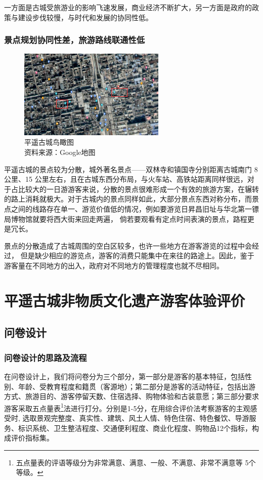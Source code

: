 \documentclass[UTF8]{ctexart}
\begin{document}
        一方面是古城受旅游业的影响飞速发展，商业经济不断扩大，另一方面是政府的政策与建设步伐较慢，与时代和发展的协同性低。
        \subsubsection{景点规划协同性差，旅游路线联通性低}
        \begin{figure}[H]
        \centering
        \includegraphics[width=7cm]{地图.png}
        \caption[plain]{平遥古城鸟瞰图\\资料来源：Google地图}
        \label{fig:my_label}
        \end{figure}
        平遥古城的景点较为分散，城外著名景点——双林寺和镇国寺分别距离古城南门 8 公里、15 公里左右，且在古城东西分布局，与火车站、高铁站距离同样很远，对于占比较大的一日游游客来说，分散的景点很难形成一个有效的旅游方案，在辗转的路上消耗就极大。对于古城内的景点同样如此，大部分景点东西对称分布，而景点之间的线路存在单一、游览价值低的情况，例如要游览日昇昌旧址与华北第一镖局博物馆就要将西大街来回走两遍， 倘若要观看有定点时间表演的景点，路程更是冗长。
        
        景点的分散造成了古城周围的空白区较多，也许一些地方在游客游览的过程中会经过， 但是缺少相应的游览点，游客的消费只能集中在来往的路途上。因此，鉴于游客量在不同地方的出入，政府对不同地方的管理程度也就不尽相同。
        
\section{平遥古城非物质文化遗产游客体验评价}
    \subsection{问卷设计}
        \subsubsection{问卷设计的思路及流程}
        在问卷设计上，我们将问卷分为三个部分，第一部分是游客的基本特征，包括性别、年龄、受教育程度和籍贯（客源地）；第二部分是游客的活动特征，包括出游方式、旅游目的、游客停留天数、住宿选择、购物体验和古装意愿；第三部分要求游客采取五点量表\footnote{五点量表的评语等级分为非常满意、满意、一般、不满意、非常不满意等 5个等级。}法进行打分。分别是1-5分，在用综合评价法考察游客的主观感受时, 选取景观完整度、真实性、建筑、风土人情、特色住宿、特色餐饮、导游服务、标识系统、卫生整洁程度、交通便利程度、商业化程度、购物品12个指标，构成评价指标集。
\end{document}
